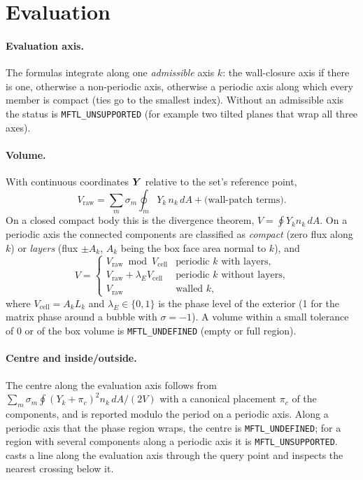 \section{Evaluation}

\paragraph{Evaluation axis.} The formulas integrate along one \emph{admissible} axis $k$: the
wall-closure axis if there is one, otherwise a non-periodic axis, otherwise a periodic axis along
which every member is compact (ties go to the smallest index). Without an admissible axis the
status is \texttt{MFTL\_UNSUPPORTED} (for example two tilted planes that wrap all three axes).

\paragraph{Volume.} With continuous coordinates $\boldsymbol{Y}$ relative to the set's reference point,
\begin{equation}
  V_{\text{raw}} = \sum_m \sigma_m \oint_m Y_k\, n_k\,dA + \text{(wall-patch terms)}.
  \label{eq:vraw}
\end{equation}
On a closed compact body this is the divergence theorem, $V=\oint Y_k n_k\,dA$. On a periodic
axis the connected components are classified as \emph{compact} (zero flux along $k$) or
\emph{layers} (flux $\pm A_k$, $A_k$ being the box face area normal to $k$), and
\begin{equation}
  V = \begin{cases}
    V_{\text{raw}} \bmod V_{\text{cell}} & \text{periodic $k$ with layers,}\\
    V_{\text{raw}} + \lambda_E V_{\text{cell}} & \text{periodic $k$ without layers,}\\
    V_{\text{raw}} & \text{walled $k$,}
  \end{cases}
\end{equation}
where $V_{\text{cell}}=A_k L_k$ and $\lambda_E\in\{0,1\}$ is the phase level of the exterior (1 for
the matrix phase around a bubble with $\sigma=-1$). A volume within a small tolerance of $0$ or of
the box volume is \texttt{MFTL\_UNDEFINED} (empty or full region).

\paragraph{Centre and inside/outside.} The centre along the evaluation axis follows from
$\sum_m\sigma_m\oint (Y_k+\pi_c)^2 n_k\,dA/(2V)$ with a canonical placement $\pi_c$ of the
components, and is reported modulo the period on a periodic axis. Along a periodic axis that the
phase region wraps, the centre is \texttt{MFTL\_UNDEFINED}; for a region with several components
along a periodic axis it is \texttt{MFTL\_UNSUPPORTED}.  casts a line
along the evaluation axis through the query point and inspects the nearest crossing below it.

